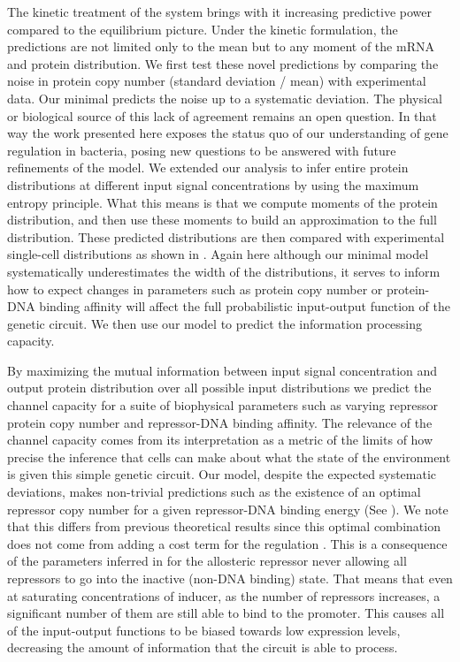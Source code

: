 The kinetic treatment of the system brings with it increasing predictive power
compared to the equilibrium picture. Under the kinetic formulation, the
predictions are not limited only to the mean but to any moment of the mRNA and
protein distribution. We first test these novel predictions by comparing the
noise in protein copy number (standard deviation / mean) with experimental
data. Our minimal predicts the noise up to a systematic deviation. The physical
or biological source of this lack of agreement remains an open question. In
that way the work presented here exposes the status quo of our understanding of
gene regulation in bacteria, posing new questions to be answered with future
refinements of the model. We extended our analysis to infer entire protein
distributions at different input signal concentrations by using the maximum
entropy principle. What this means is that we compute moments of the protein
distribution, and then use these moments to build an approximation to the full
distribution. These predicted distributions are then compared with experimental
single-cell distributions as shown in . Again here although
our minimal model systematically underestimates the width of the distributions,
it serves to inform how to expect changes in parameters such as protein copy
number or protein-DNA binding affinity will affect the full probabilistic
input-output function of the genetic circuit. We then use our model to predict
the information processing capacity.

By maximizing the mutual information between input signal concentration and
output protein distribution over all possible input distributions we predict
the channel capacity for a suite of biophysical parameters such as varying
repressor protein copy number and repressor-DNA binding affinity. The relevance
of the channel capacity comes from its interpretation as a metric of the limits
of how precise the inference that cells can make about what the state of the
environment is given this simple genetic circuit. Our model, despite the
expected systematic deviations, makes non-trivial predictions such as the
existence of an optimal repressor copy number for a given repressor-DNA binding
energy (See ). We note that this differs from previous
theoretical results since this optimal combination does not come from adding a
cost term for the regulation \cite{Tkacik2011}. This is a consequence of the
parameters inferred in \cite{Razo-Mejia2018} for the allosteric repressor never
allowing all repressors to go into the inactive (non-DNA binding) state. That
means that even at saturating concentrations of inducer, as the number of
repressors increases, a significant number of them are still able to bind to
the promoter. This causes all of the input-output functions to be biased
towards low expression levels, decreasing the amount of information that the
circuit is able to process.

